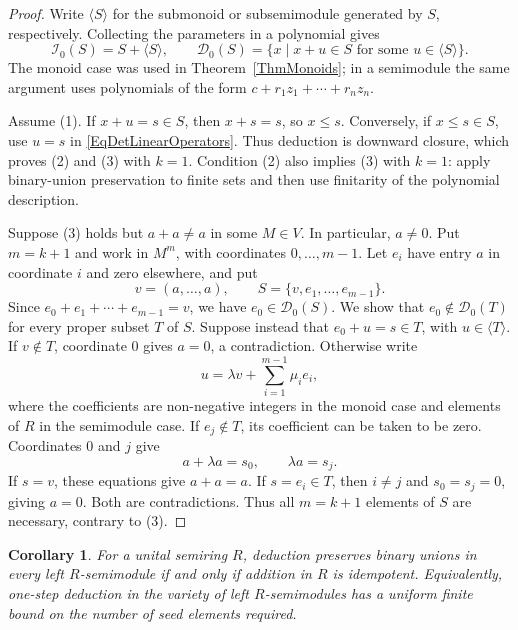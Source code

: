 \documentclass[12pt,english]{amsart}
\newtheorem{corollary}[theorem]{Corollary}
\theoremstyle{definition}
\numberwithin{equation}{section}
\theoremstyle{remark}
\begin{document}
\begin{proof}
Write $\langle S\rangle$ for the submonoid or subsemimodule generated
by $S$, respectively. Collecting the parameters in a polynomial gives
\begin{equation}\label{EqDetLinearOperators}
\mathcal I_0(S)=S+\langle S\rangle,
\qquad
\mathcal D_0(S)=
\{x\mid x+u\in S\text{ for some }u\in\langle S\rangle\}.
\end{equation}
The monoid case was used in Theorem~\ref{ThmMonoids}; in a semimodule
the same argument uses polynomials of the form
$c+r_1z_1+\cdots+r_nz_n$.

Assume (1). If $x+u=s\in S$, then $x+s=s$, so $x\leqslant s$.
Conversely, if $x\leqslant s\in S$, use $u=s$ in
\eqref{EqDetLinearOperators}. Thus deduction is downward closure,
which proves (2) and (3) with $k=1$. Condition (2) also implies (3)
with $k=1$: apply binary-union preservation to finite sets and then
use finitarity of the polynomial description.

Suppose (3) holds but $a+a\ne a$ in some $M\in V$. In particular,
$a\ne0$. Put $m=k+1$ and work in $M^m$, with coordinates
$0,\ldots,m-1$. Let $e_i$ have entry $a$ in coordinate $i$ and zero
elsewhere, and put
\[
v=(a,\ldots,a),\qquad S=\{v,e_1,\ldots,e_{m-1}\}.
\]
Since $e_0+e_1+\cdots+e_{m-1}=v$, we have
$e_0\in\mathcal D_0(S)$. We show that
$e_0\notin\mathcal D_0(T)$ for every proper subset $T$ of $S$.
Suppose instead that $e_0+u=s\in T$, with
$u\in\langle T\rangle$.
If $v\notin T$, coordinate $0$ gives $a=0$, a contradiction.
Otherwise write
\[
u=\lambda v+\sum_{i=1}^{m-1}\mu_i e_i,
\]
where the coefficients are non-negative integers in the monoid case
and elements of $R$ in the semimodule case. If $e_j\notin T$, its
coefficient can be taken to be zero. Coordinates $0$ and $j$ give
\[
a+\lambda a=s_0,\qquad \lambda a=s_j.
\]
If $s=v$, these equations give $a+a=a$. If $s=e_i\in T$, then
$i\ne j$ and $s_0=s_j=0$, giving $a=0$. Both are contradictions.
Thus all $m=k+1$ elements of $S$ are necessary, contrary to (3).
\end{proof}

\begin{corollary}\label{CorDetIdempotentSemiring}
For a unital semiring $R$, deduction preserves binary unions in every
left $R$-semimodule if and only if addition in $R$ is idempotent.
Equivalently, one-step deduction in the variety of left
$R$-semimodules has a uniform finite bound on the number of seed
elements required.
\end{corollary}
\end{document}
